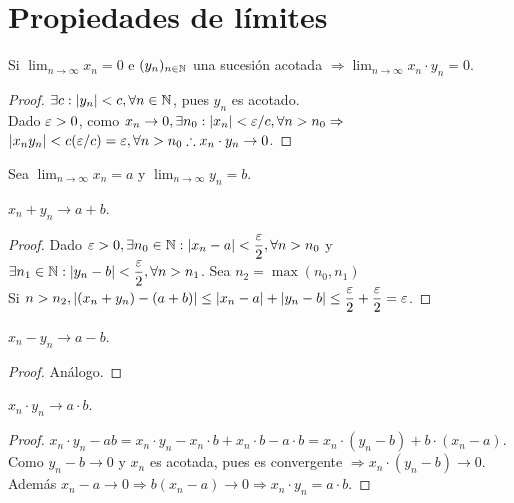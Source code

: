 \clearpage

\section{Propiedades de límites}

\begin{theorem}
  Si \(\lim_{n \to \infty} x_n = 0\) e \((y_n)_{n \in \mathbb{N}} \) una sucesión acotada \(\Rightarrow \lim_{n \to \infty} x_n \cdot y_n = 0\).
  \begin{proof}
    \(\exists c : |y_n| < c, \forall n \in \mathbb{N} \), pues \(y_n\) es acotado. \\
    Dado \(\varepsilon > 0\), como \(x_n \to 0, \exists n_0 : |x_n| < \varepsilon/c, \forall n > n_0 \Rightarrow \) \\
    \(|x_n y_n| < c (\varepsilon/c) = \varepsilon, \forall n > n_0 \therefore x_n \cdot y_n \to 0\).
  \end{proof}
\end{theorem}

Sea \(\lim_{n \to \infty} x_n = a\) y \(\lim_{n \to \infty} y_n = b\).

\begin{prop}
  \(x_n + y_n \to a+b\).
  \begin{proof}
    Dado \(\varepsilon > 0, \exists n_0 \in \mathbb{N} : |x_n - a| < \dfrac{\varepsilon}{2}, \forall n > n_0\) y \\ \(\exists n_1 \in \mathbb{N} : |y_n - b| < \dfrac{\varepsilon}{2}, \forall n > n_1\).
    Sea \(n_2 = \max(n_0, n_1)\) \\
    Si \(n > n_2, |(x_n + y_n)-(a + b)| \leq |x_n - a| + |y_n - b| \leq \dfrac{\varepsilon}{2} + \dfrac{\varepsilon}{2} = \varepsilon \).
  \end{proof}
\end{prop}

\begin{prop}
  \(x_n - y_n \to a-b\).
  \begin{proof}
    Análogo.
  \end{proof}
\end{prop}

\begin{prop}
  \(x_n \cdot y_n \to a \cdot b\).
  \begin{proof}
    \(x_n \cdot y_n - ab = x_n \cdot y_n - x_n \cdot b + x_n \cdot b - a \cdot b = x_n \cdot (y_n - b) + b \cdot (x_n - a)\). \\
    Como \(y_n - b \to 0\) y \(x_n\) es acotada, pues es convergente \(\Rightarrow x_n \cdot (y_n-b) \to 0\).
    Además \(x_n - a \to 0 \Rightarrow b(x_n - a) \to 0 \Rightarrow x_n \cdot y_n = a \cdot b\).
  \end{proof}
\end{prop}

